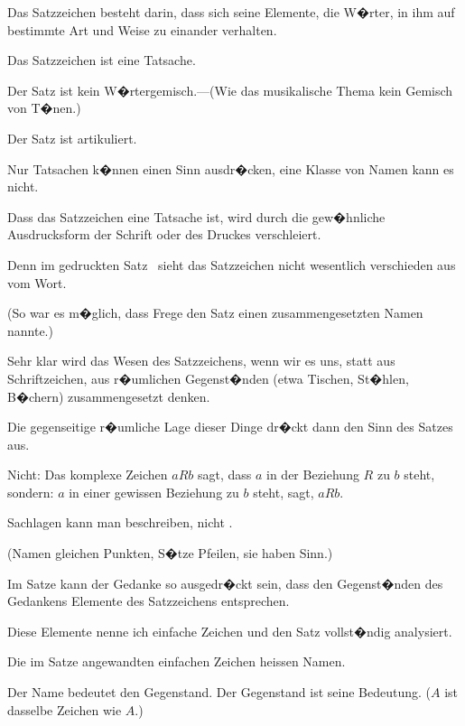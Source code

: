 {Das Satzzeichen besteht darin, dass sich seine
Elemente, die W�rter, in ihm auf bestimmte Art
und Weise zu einander verhalten.

Das Satzzeichen ist eine Tatsache.}


{Der Satz ist kein W�rtergemisch.---(Wie
das musikalische Thema kein Gemisch von
T�nen.)

Der Satz ist artikuliert.}


{Nur Tatsachen k�nnen einen Sinn ausdr�cken,
eine Klasse von Namen kann es nicht.}


{Dass das Satzzeichen eine Tatsache ist, wird
durch die gew�hnliche Ausdrucksform der Schrift
oder des Druckes verschleiert.

Denn im gedruckten Satz \zumBeispiel\ sieht das Satzzeichen
nicht wesentlich verschieden aus vom
Wort.

(So war es m�glich, dass Frege den Satz einen
zusammengesetzten Namen nannte.)}


{Sehr klar wird das Wesen des Satzzeichens,
wenn wir es uns, statt aus Schriftzeichen, aus
r�umlichen Gegenst�nden (etwa Tischen, St�hlen,
B�chern) zusammengesetzt denken.

Die gegenseitige r�umliche Lage dieser Dinge
dr�ckt dann den Sinn des Satzes aus.}


{Nicht: \glqq{}Das komplexe Zeichen \glq{}$aRb$\grq{} sagt,
dass $a$ in der Beziehung $R$ zu $b$ steht\grqq{}, sondern:
 \glqq{}$a$\grqq{} in einer gewissen Beziehung zu \glqq{}$b$\grqq{}
steht, sagt,  $aRb$.}


{Sachlagen kann man beschreiben, nicht .

(Namen gleichen Punkten, S�tze Pfeilen, sie
haben Sinn.)}


{Im Satze kann der Gedanke so ausgedr�ckt sein,
dass den Gegenst�nden des Gedankens Elemente
des Satzzeichens entsprechen.}


{Diese Elemente nenne ich \glqq{}einfache Zeichen\grqq{}
und den Satz \glqq{}vollst�ndig analysiert\grqq{}.}


{Die im Satze angewandten einfachen Zeichen
heissen Namen.}


{Der Name bedeutet den Gegenstand. Der
Gegenstand ist seine Bedeutung. (\glqq{}$A$\grqq{} ist dasselbe
Zeichen wie \glqq{}$A$\grqq{}.)}


